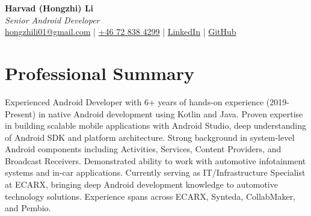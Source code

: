 \documentclass[11pt,a4paper]{article}
\begin{document}
\begin{center}
{\LARGE \textbf{Harvad (Hongzhi) Li}}\\[10pt]
{\Large \textit{Senior Android Developer}}\\[10pt]
\textcolor{titlecolor}{\href{mailto:hongzhili01@gmail.com}{hongzhili01@gmail.com} | \href{tel:+46728384299}{+46 72 838 4299} | \href{https://www.linkedin.com/in/harvad/}{LinkedIn} | \href{https://github.com/bluehawana}{GitHub}}
\end{center}

\vspace{8pt}

\section*{Professional Summary}
Experienced Android Developer with 6+ years of hands-on experience (2019-Present) in native Android development using Kotlin and Java. Proven expertise in building scalable mobile applications with Android Studio, deep understanding of Android SDK and platform architecture. Strong background in system-level Android components including Activities, Services, Content Providers, and Broadcast Receivers. Demonstrated ability to work with automotive infotainment systems and in-car applications. Currently serving as IT/Infrastructure Specialist at ECARX, bringing deep Android development knowledge to automotive technology solutions. Experience spans across ECARX, Synteda, CollabMaker, and Pembio.
\end{document}
